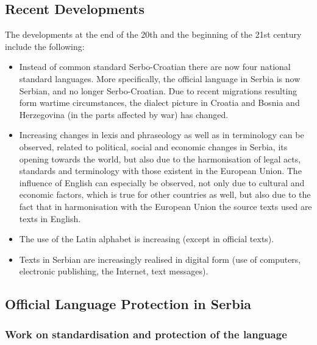 {\begin{multicols}{2}


\subsection{Recent Developments}


The developments at the end of the 20th and the beginning of the 21st century include the following:
\begin{itemize}
 \item Instead of common standard Serbo-Croatian there are now four national standard languages. More specifically, the official language in Serbia is now Serbian, and no longer Serbo-Croatian.  Due to recent migrations resulting form wartime circumstances, the dialect picture in Croatia and Bosnia and Herzegovina (in the parts affected by war) has changed. 
\item Increasing changes in lexis and phraseology as well as in terminology can be observed, related to political, social and economic changes in Serbia, its opening towards the world, but also due to the harmonisation of legal acts, standards and terminology with those existent in the European Union. The influence of English can especially be observed, not only due to cultural and economic factors, which is true for other countries as well, but also due to the fact that in harmonisation with the European Union the source texts used are texts in English. 
\item The use of the Latin alphabet is increasing (except in official texts). 
\item Texts in Serbian are increasingly realised in digital form (use of computers, electronic publishing, the Internet, text messages). 
\end{itemize}

\subsection {Official Language Protection in Serbia}

\subsubsection{Work on standardisation and protection of the language}   


\end{multicols}}
